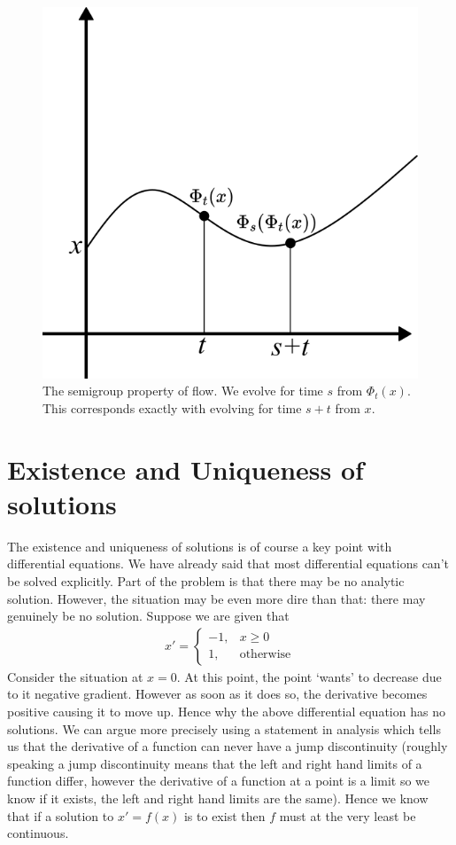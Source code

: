 \begin{figure}[h]
    \centering
    \includegraphics[scale=0.7]{Images/flow_semigroup.png}
    \caption{The semigroup property of flow. We evolve for time $s$ from $\Phi_t(x)$. This corresponds exactly with evolving for time $s + t$ from $x$.}
    \label{fig:flow-semigroup-prop}
\end{figure}


\section{Existence and Uniqueness of solutions}
The existence and uniqueness of solutions is of course a key point with differential equations. We have already said that most differential equations can't be solved explicitly. Part of the problem is that there may be no analytic solution. However, the situation may be even more dire than that: there may genuinely be no solution. Suppose we are given that
\begin{align*}
    x' = \begin{cases}
    -1, & x \geq 0\\
    1, & \text{otherwise}
    \end{cases}
\end{align*}
Consider the situation at $x = 0$. At this point, the point `wants' to decrease due to it negative gradient. However as soon as it does so, the derivative becomes positive causing it to move up. Hence why the above differential equation has no solutions. We can argue more precisely using a statement in analysis which tells us that the derivative of a function can never have a jump discontinuity (roughly speaking a jump discontinuity means that the left and right hand limits of a function differ, however the derivative of a function at a point is a limit so we know if it exists, the left and right hand limits are the same). Hence we know that if a solution to $x' = f(x)$ is to exist then $f$ must at the very least be continuous.

